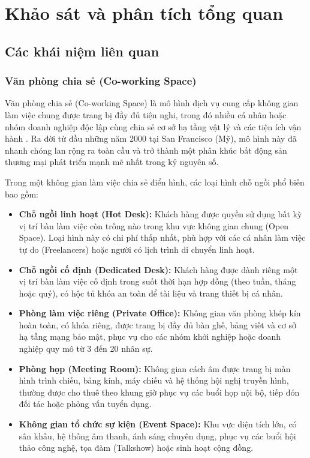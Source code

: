 \chapter{Khảo sát và phân tích tổng quan}
\label{ch:khaosat}

\section{Các khái niệm liên quan}
\label{sec:khainiem}

\subsection{Văn phòng chia sẻ (Co-working Space)}
Văn phòng chia sẻ (Co-working Space) là mô hình dịch vụ cung cấp không gian làm việc chung được trang bị đầy đủ tiện nghi, trong đó nhiều cá nhân hoặc nhóm doanh nghiệp độc lập cùng chia sẻ cơ sở hạ tầng vật lý và các tiện ích vận hành \cite{fielding2000rest}. Ra đời từ đầu những năm 2000 tại San Francisco (Mỹ), mô hình này đã nhanh chóng lan rộng ra toàn cầu và trở thành một phân khúc bất động sản thương mại phát triển mạnh mẽ nhất trong kỷ nguyên số.

Trong một không gian làm việc chia sẻ điển hình, các loại hình chỗ ngồi phổ biến bao gồm:
\begin{itemize}
    \item \textbf{Chỗ ngồi linh hoạt (Hot Desk):} Khách hàng được quyền sử dụng bất kỳ vị trí bàn làm việc còn trống nào trong khu vực không gian chung (Open Space). Loại hình này có chi phí thấp nhất, phù hợp với các cá nhân làm việc tự do (Freelancers) hoặc người có lịch trình di chuyển linh hoạt.
    \item \textbf{Chỗ ngồi cố định (Dedicated Desk):} Khách hàng được dành riêng một vị trí bàn làm việc cố định trong suốt thời hạn hợp đồng (theo tuần, tháng hoặc quý), có hộc tủ khóa an toàn để tài liệu và trang thiết bị cá nhân.
    \item \textbf{Phòng làm việc riêng (Private Office):} Không gian văn phòng khép kín hoàn toàn, có khóa riêng, được trang bị đầy đủ bàn ghế, bảng viết và cơ sở hạ tầng mạng bảo mật, phục vụ cho các nhóm khởi nghiệp hoặc doanh nghiệp quy mô từ 3 đến 20 nhân sự.
    \item \textbf{Phòng họp (Meeting Room):} Không gian cách âm được trang bị màn hình trình chiếu, bảng kính, máy chiếu và hệ thống hội nghị truyền hình, thường được cho thuê theo khung giờ phục vụ các buổi họp nội bộ, tiếp đón đối tác hoặc phỏng vấn tuyển dụng.
    \item \textbf{Không gian tổ chức sự kiện (Event Space):} Khu vực diện tích lớn, có sân khấu, hệ thống âm thanh, ánh sáng chuyên dụng, phục vụ các buổi hội thảo công nghệ, tọa đàm (Talkshow) hoặc sinh hoạt cộng đồng.
\end{itemize}

